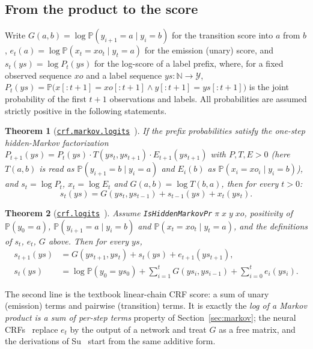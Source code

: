 \documentclass[11pt,a4paper]{article}
\newcommand{\lmod}[2]{\href{http://www.lemma.cn/lean/?module=#2}{\nolinkurl{#1}}}
\newtheorem{theorem}{Theorem}[section]
\newcommand{\N}{\mathbb{N}}
\newcommand{\Prb}{\mathbb{P}}
\newcommand{\Y}{\mathcal{Y}}
\begin{document}
\subsection{From the product to the score}
\label{sec:score}
Write $G(a,b)=\log\Prb(y_{i+1}=a\mid y_i=b)$ for the transition score into $a$ from $b$, $e_t(a)=\log\Prb(x_t=xo_t\mid y_t=a)$ for the emission (unary) score, and $s_t(ys)=\log P_t(ys)$ for the log-score of a label prefix, where, for a fixed observed sequence $xo$ and a label sequence $ys:\N\to\Y$, $P_t(ys)=\Prb\bigl(x[{:}t{+}1]=xo[{:}t{+}1]\wedge y[{:}t{+}1]=ys[{:}t{+}1]\bigr)$ is the joint probability of the first $t+1$ observations and labels.
All probabilities are assumed strictly positive in the following statements.

\begin{theorem}[\lmod{crf.markov.logits}{Tensor.Eq.of.Ne_0.Eq.Eq.Eq.Eq_log.Eq_log.Eq_log}~\cite{lemma_crf_markov_logits}]
\label{thm:logits0}
If the prefix probabilities satisfy the one-step hidden-Markov factorization $P_{t+1}(ys)=P_t(ys)\cdot T(ys_t,ys_{t+1})\cdot E_{t+1}(ys_{t+1})$ with $P,T,E>0$ (here $T(a,b)$ is read as $\Prb(y_{i+1}=b\mid y_i=a)$ and $E_i(b)$ as $\Prb(x_i=xo_i\mid y_i=b)$), and $s_t=\log P_t$, $x_t=\log E_t$ and $G(a,b)=\log T(b,a)$, then for every $t>0$:
\[
s_t(ys)=G(ys_t,ys_{t-1})+s_{t-1}(ys)+x_t(ys_t).
\]
\end{theorem}

\begin{theorem}[\lmod{crf.logits}{Tensor.Imp.of.Eq}~\cite{lemma_crf_logits}]
\label{thm:logits}
Assume \texttt{IsHiddenMarkovPr}$\;\pi\;x\;y\;xo$, positivity of $\Prb(y_0=a)$, $\Prb(y_{i+1}=a\mid y_i=b)$ and $\Prb(x_t=xo_t\mid y_t=a)$, and the definitions of $s_t$, $e_t$, $G$ above.
Then for every $ys$,
\begin{align*}
s_{t+1}(ys)&=G(ys_{t+1},ys_t)+s_t(ys)+e_{t+1}(ys_{t+1}),\\
s_t(ys)&=\log\Prb(y_0=ys_0)+\sum_{i=1}^{t}G(ys_i,ys_{i-1})+\sum_{i=0}^{t}e_i(ys_i).
\end{align*}
\end{theorem}
The second line is the textbook linear-chain CRF score: a sum of unary (emission) terms and pairwise (transition) terms.
It is exactly the \emph{log of a Markov product is a sum of per-step terms} property of Section~\ref{sec:markov}; the neural CRFs~\cite{huang2015bilstmcrf,lample2016ner,ma2016bilstmcnnscrf} replace $e_t$ by the output of a network and treat $G$ as a free matrix, and the derivations of Su~\cite{su2017crf} start from the same additive form.
\end{document}
